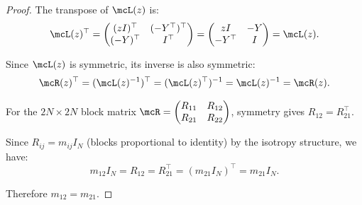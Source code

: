 \begin{proof}
The transpose of $\mcL(z)$ is:
\[
\mcL(z)^\top = \begin{pmatrix} (zI)^\top & (-Y^\top)^\top \\ (-Y)^\top & I^\top \end{pmatrix} = \begin{pmatrix} zI & -Y \\ -Y^\top & I \end{pmatrix} = \mcL(z).
\]

Since $\mcL(z)$ is symmetric, its inverse is also symmetric:
\[
\mcR(z)^\top = (\mcL(z)^{-1})^\top = (\mcL(z)^\top)^{-1} = \mcL(z)^{-1} = \mcR(z).
\]

For the $2N \times 2N$ block matrix $\mcR = \begin{pmatrix} R_{11} & R_{12} \\ R_{21} & R_{22} \end{pmatrix}$, symmetry gives $R_{12} = R_{21}^\top$.

Since $R_{ij} = m_{ij} I_N$ (blocks proportional to identity) by the isotropy structure, we have:
\[
m_{12} I_N = R_{12} = R_{21}^\top = (m_{21} I_N)^\top = m_{21} I_N.
\]

Therefore $m_{12} = m_{21}$.
\end{proof}

